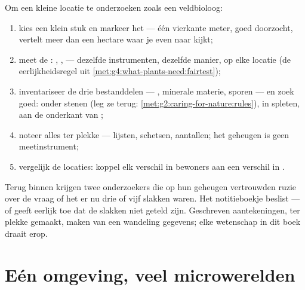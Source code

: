 \begin{method}\label{met:g6:exploring-our-environment:survey}
Om een kleine locatie te onderzoeken zoals een veldbioloog:
\begin{enumerate}
  \item kies een klein stuk en markeer het --- één vierkante meter, goed
        doorzocht, vertelt meer dan een hectare waar je even naar kijkt;
  \item meet de : , ,  ---
        dezelfde instrumenten, dezelfde manier, op elke locatie (de
        eerlijkheidsregel uit
        \cref{met:g4:what-plants-need:fairtest});
  \item inventariseer de drie  bestanddelen --- ,
        minerale materie, sporen --- en zoek goed: onder stenen (leg ze
        terug: \cref{met:g2:caring-for-nature:rules}), in spleten, aan
        de onderkant van ;
  \item noteer alles ter plekke --- lijsten, schetsen, aantallen; het
        geheugen is geen meetinstrument;
  \item vergelijk de locaties: koppel elk verschil in bewoners aan een
        verschil in .
\end{enumerate}
\end{method}

\begin{remark}\label{rem:g6:exploring-our-environment:records}
Terug binnen krijgen twee onderzoekers die op hun geheugen vertrouwden
ruzie over de vraag of het er nu drie of vijf slakken waren. Het
notitieboekje beslist --- of geeft eerlijk toe dat de slakken niet
geteld zijn. Geschreven aantekeningen, ter plekke gemaakt, maken van een
wandeling gegevens; elke wetenschap in dit boek draait erop.
\end{remark}

\section{Eén omgeving, veel microwerelden}

